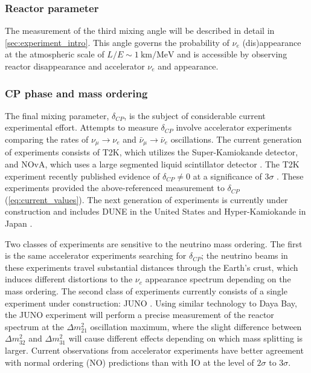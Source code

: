 \subsubsection{Reactor parameter}
The measurement of the third mixing angle \thetaot{}
will be described in detail in \cref{sec:experiment_intro}.
This angle
governs the probability of $\nu_e$ (dis)appearance
at the atmospheric scale of $L/E \sim \SI{1}{\km\per\MeV}$
and is accessible by observing reactor \nuebar{} disappearance
and accelerator $\nu_e$ and \nuebar{} appearance.

\subsubsection{CP phase and mass ordering}
The final mixing parameter, $\delta_{CP}$,
is the subject of considerable current experimental effort.
Attempts to measure $\delta_{CP}$ involve
accelerator experiments comparing the rates of
$\nu_\mu\to\nu_e$ and $\bar{\nu}_\mu\to\bar{\nu}_e$ oscillations.
The current generation of experiments consists of
T2K, which utilizes the Super-Kamiokande detector,
and NOvA,
which uses a large segmented liquid scintillator detector \cite{nova_deltacp}.
The T2K experiment recently published evidence of $\delta_{CP}\neq 0$
at a significance of $3\sigma$ \cite{t2k_deltacp}.
These experiments provided the above-referenced measurement to $\delta_{CP}$
(\cref{eq:current_values}).
The next generation of experiments is currently under construction
and includes DUNE in the United States \cite{dune_potential}
and Hyper-Kamiokande in Japan \cite{hyperk2015}.

Two classes of experiments are sensitive to the neutrino mass ordering.
The first is the same accelerator experiments searching for $\delta_{CP}$;
the neutrino beams in these experiments travel substantial distances
through the Earth's crust,
which induces different distortions to the $\nu_e$ appearance spectrum
depending on the mass ordering.
The second class of experiments currently consists of
a single experiment under construction: JUNO \cite{junoproposal2016}.
Using similar technology to Daya Bay,
the JUNO experiment will perform a precise measurement
of the reactor \nuebar{} spectrum
at the $\Delta m^2_{21}$ oscillation maximum,
where the slight difference between
$\Delta m^2_{32}$ and $\Delta m^2_{31}$
will cause different effects depending
on which mass splitting is larger.
Current observations from accelerator experiments
have better agreement with normal ordering (NO)
predictions than with IO at the level of $2\sigma$ to $3\sigma$.

